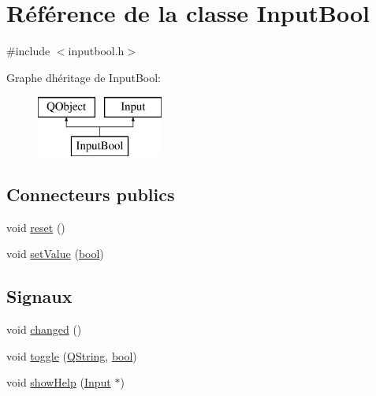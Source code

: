 \hypertarget{class_input_bool}{}\section{Référence de la classe Input\+Bool}
\label{class_input_bool}


{\ttfamily \#include $<$inputbool.\+h$>$}

Graphe d\textquotesingle{}héritage de Input\+Bool\+:\begin{figure}[H]
\begin{center}
\leavevmode
\includegraphics[height=2.000000cm]{class_input_bool}
\end{center}
\end{figure}
\subsection*{Connecteurs publics}
\begin{DoxyCompactItemize}
\item 
void \hyperlink{class_input_bool_a6fcd5209f610ec46710bb4133d908f94}{reset} ()
\item 
void \hyperlink{class_input_bool_a45b8963e33372106280a9b79ad273acb}{set\+Value} (\hyperlink{qglobal_8h_a1062901a7428fdd9c7f180f5e01ea056}{bool})
\end{DoxyCompactItemize}
\subsection*{Signaux}
\begin{DoxyCompactItemize}
\item 
void \hyperlink{class_input_bool_a321a7b75c6aea35d25f8a09bd636694a}{changed} ()
\item 
void \hyperlink{class_input_bool_adf11e1243ca0ad963b19264b0d8556ff}{toggle} (\hyperlink{class_q_string}{Q\+String}, \hyperlink{qglobal_8h_a1062901a7428fdd9c7f180f5e01ea056}{bool})
\item 
void \hyperlink{class_input_bool_a5a106ff283efd58007d8b0958a0f8c54}{show\+Help} (\hyperlink{class_input}{Input} $\ast$)
\end{DoxyCompactItemize}
